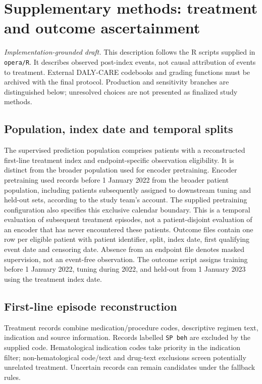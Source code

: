 \documentclass[10pt]{article}
\begin{document}
\noindent{}\par\medskip

\section*{Supplementary methods: treatment and outcome ascertainment}
\noindent\textit{Implementation-grounded draft.} This description follows the
R scripts supplied in \texttt{opera/R}. It describes observed post-index
events, not causal attribution of events to treatment. External DALY-CARE
codebooks and grading functions must be archived with the final protocol.
Production and sensitivity branches are distinguished below; unresolved
choices are not presented as finalized study methods.

\subsection*{Population, index date and temporal splits}
The supervised prediction population comprises patients with a reconstructed
first-line treatment index and endpoint-specific observation eligibility.
It is distinct from the broader population used for encoder pretraining.
Encoder pretraining used records before 1 January 2022 from the broader patient
population, including patients subsequently assigned to downstream tuning and
held-out sets, according to the study team's account. The supplied pretraining
configuration also specifies this exclusive calendar boundary. This is a
temporal evaluation of subsequent treatment episodes, not a patient-disjoint
evaluation of an encoder that has never encountered these patients.
Outcome files contain one row per eligible patient with patient identifier,
split, index date, first qualifying event date and censoring date. Absence from
an endpoint file denotes masked supervision, not an event-free observation.
The outcome script assigns training before 1 January 2022, tuning during
2022, and held-out from 1 January 2023 using the treatment index date.

\subsection*{First-line episode reconstruction}
Treatment records combine medication/procedure codes, descriptive regimen
text, indication and source information. Records labelled \texttt{SP beh}
are excluded by the supplied code. Hematological indication codes take
priority in the indication filter; non-hematological code/text and drug-text
exclusions screen potentially unrelated treatment. Uncertain records can
remain candidates under the fallback rules.
\end{document}
